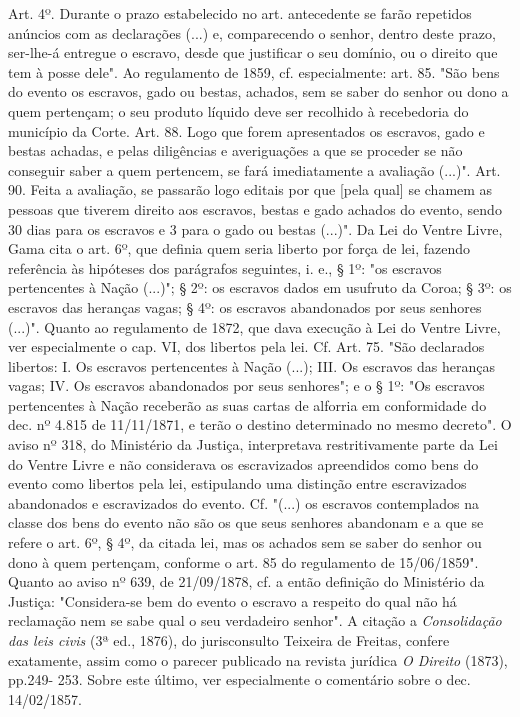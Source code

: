 {  Art. 4º. Durante o prazo estabelecido no art. antecedente se farão
  repetidos anúncios com as declarações (...) e, comparecendo o senhor,
  dentro deste prazo, ser-lhe-á entregue o escravo, desde que justificar
  o seu domínio, ou o direito que tem à posse dele". Ao regulamento de
  1859, cf. especialmente: art. 85. "São bens do evento os escravos,
  gado ou bestas, achados, sem se saber do senhor ou dono a quem
  pertençam; o seu produto líquido deve ser recolhido à recebedoria do
  município da Corte. Art. 88. Logo que forem apresentados os escravos,
  gado e bestas achadas, e pelas diligências e averiguações a que se
  proceder se não conseguir saber a quem pertencem, se fará
  imediatamente a avaliação (...)". Art. 90. Feita a avaliação, se
  passarão logo editais por que {[}pela qual{]} se chamem as pessoas que
  tiverem direito aos escravos, bestas e gado achados do evento, sendo
  30 dias para os escravos e 3 para o gado ou bestas (...)". Da Lei do
  Ventre Livre, Gama cita o art. 6º, que definia quem seria liberto por
  força de lei, fazendo referência às hipóteses dos parágrafos
  seguintes, i. e., § 1º: "os escravos pertencentes à Nação (...)"; §
  2º: os escravos dados em usufruto da Coroa; § 3º: os escravos das
  heranças vagas; § 4º: os escravos abandonados por seus senhores
  (...)". Quanto ao regulamento de 1872, que dava execução à Lei do
  Ventre Livre, ver especialmente o cap. VI, dos libertos pela lei. Cf.
  Art. 75. "São declarados libertos: I. Os escravos pertencentes à Nação
  (...); III. Os escravos das heranças vagas; IV. Os escravos
  abandonados por seus senhores"; e o § 1º: "Os escravos pertencentes à
  Nação receberão as suas cartas de alforria em conformidade do dec. nº
  4.815 de 11/11/1871, e terão o destino determinado no mesmo decreto".
  O aviso nº 318, do Ministério da Justiça, interpretava restritivamente
  parte da Lei do Ventre Livre e não considerava os escravizados
  apreendidos como bens do evento como libertos pela lei, estipulando
  uma distinção entre escravizados abandonados e escravizados do evento.
  Cf. "(...) os escravos contemplados na classe dos bens do evento não
  são os que seus senhores abandonam e a que se refere o art. 6º, § 4º,
  da citada lei, mas os achados sem se saber do senhor ou dono à quem
  pertençam, conforme o art. 85 do regulamento de 15/06/1859". Quanto ao
  aviso nº 639, de 21/09/1878, cf. a então definição do Ministério da
  Justiça: "Considera-se bem do evento o escravo a respeito do qual não
  há reclamação nem se sabe qual o seu verdadeiro senhor". A citação a
  \emph{Consolidação das leis civis} (3ª ed., 1876), do jurisconsulto
  Teixeira de Freitas, confere exatamente, assim como o parecer
  publicado na revista jurídica \emph{O Direito} (1873), pp.249- 253.
  Sobre este último, ver especialmente o comentário sobre o dec.
  14/02/1857.}

